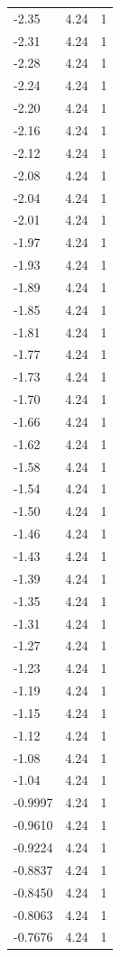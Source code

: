 \begin{longtable}{lrr}
  -2.35 & 4.24 & 1 \\
  -2.31 & 4.24 & 1 \\
  -2.28 & 4.24 & 1 \\
  -2.24 & 4.24 & 1 \\
  -2.20 & 4.24 & 1 \\
  -2.16 & 4.24 & 1 \\
  -2.12 & 4.24 & 1 \\
  -2.08 & 4.24 & 1 \\
  -2.04 & 4.24 & 1 \\
  -2.01 & 4.24 & 1 \\
  -1.97 & 4.24 & 1 \\
  -1.93 & 4.24 & 1 \\
  -1.89 & 4.24 & 1 \\
  -1.85 & 4.24 & 1 \\
  -1.81 & 4.24 & 1 \\
  -1.77 & 4.24 & 1 \\
  -1.73 & 4.24 & 1 \\
  -1.70 & 4.24 & 1 \\
  -1.66 & 4.24 & 1 \\
  -1.62 & 4.24 & 1 \\
  -1.58 & 4.24 & 1 \\
  -1.54 & 4.24 & 1 \\
  -1.50 & 4.24 & 1 \\
  -1.46 & 4.24 & 1 \\
  -1.43 & 4.24 & 1 \\
  -1.39 & 4.24 & 1 \\
  -1.35 & 4.24 & 1 \\
  -1.31 & 4.24 & 1 \\
  -1.27 & 4.24 & 1 \\
  -1.23 & 4.24 & 1 \\
  -1.19 & 4.24 & 1 \\
  -1.15 & 4.24 & 1 \\
  -1.12 & 4.24 & 1 \\
  -1.08 & 4.24 & 1 \\
  -1.04 & 4.24 & 1 \\
  -0.9997 & 4.24 & 1 \\
  -0.9610 & 4.24 & 1 \\
  -0.9224 & 4.24 & 1 \\
  -0.8837 & 4.24 & 1 \\
  -0.8450 & 4.24 & 1 \\
  -0.8063 & 4.24 & 1 \\
  -0.7676 & 4.24 & 1 \\

\end{longtable}

